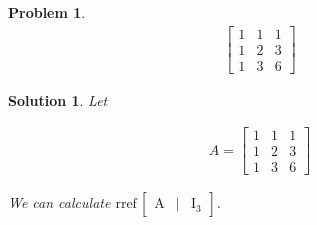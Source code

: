 \documentclass{article}
\newtheorem{problem}{Problem}
\newtheorem*{solution}{Solution}
\newcommand{\rref}[1]{\mathrm{rref \, #1}}
\begin{document}
\begin{problem}
\begin{align*}
\begin{bmatrix}
1 & 1 & 1 \\
1 & 2 & 3 \\
1 & 3 & 6
\end{bmatrix}
\end{align*}
\end{problem}

\begin{solution}
Let 

\begin{align*}
A = \begin{bmatrix}
1 & 1 & 1 \\
1 & 2 & 3 \\
1 & 3 & 6
\end{bmatrix}
\end{align*}

We can calculate $\rref{\begin{bmatrix}A & \vert & I_{3}\end{bmatrix}}$.


\end{solution}
\end{document}
